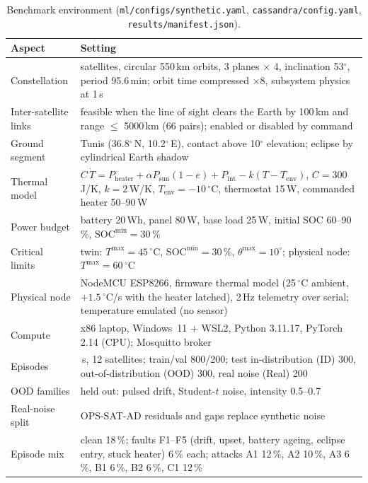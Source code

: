 \documentclass[10pt,a4paper]{article}
\newcommand{\file}[1]{\texttt{#1}}
\newcommand{\degC}{$^{\circ}$C}
\begin{document}
\begin{table}[ht]
\centering
\caption{Benchmark environment (\file{ml/configs/synthetic.yaml}, \file{cassandra/config.yaml},
\file{results/manifest.json}).}
\label{tab:testbed}
\small
\begin{tabular}{@{}>{\raggedright\arraybackslash}p{}>{\raggedright\arraybackslash}p{}@{}}
\toprule
Aspect & Setting \\
\midrule
Constellation & 12 satellites, circular 550\,km orbits, 3 planes $\times$ 4, inclination 53$^{\circ}$, period 95.6\,min; orbit time compressed $\times$8, subsystem physics at 1\,s \\
Inter-satellite links & feasible when the line of sight clears the Earth by 100\,km and range $\le$ 5000\,km (66 pairs); enabled or disabled by command \\
Ground segment & Tunis (36.8$^{\circ}$\,N, 10.2$^{\circ}$\,E), contact above 10$^{\circ}$ elevation; eclipse by cylindrical Earth shadow \\
Thermal model & $C\,\dot T=P_{\mathrm{heater}}+\alpha P_{\mathrm{sun}}(1-e)+P_{\mathrm{int}}-k(T-T_{\mathrm{env}})$, $C=300$\,J/K, $k=2$\,W/K, $T_{\mathrm{env}}=-10$\,\degC, thermostat 15\,W, commanded heater 50--90\,W \\
Power budget & battery 20\,Wh, panel 80\,W, base load 25\,W, initial SOC 60--90\,\%, $\mathrm{SOC}^{\min}=30$\,\% \\
Critical limits & twin: $T^{\max}=45$\,\degC, $\mathrm{SOC}^{\min}=30$\,\%, $\theta^{\max}=10^{\circ}$; physical node: $T^{\max}=60$\,\degC \\
Physical node & NodeMCU ESP8266, firmware thermal model (25\,\degC{} ambient, $+1.5$\,\degC/s with the heater latched), 2\,Hz telemetry over serial; temperature emulated (no sensor) \\
Compute & x86 laptop, Windows~11 + WSL2, Python 3.11.17, PyTorch 2.14 (CPU); Mosquitto broker \\
Episodes & 600\,s, 12 satellites; train/val 800/200; test in-distribution (ID) 300, out-of-distribution (OOD) 300, real noise (Real) 200 \\
OOD families & held out: pulsed drift, Student-$t$ noise, intensity 0.5--0.7 \\
Real-noise split & OPS-SAT-AD residuals and gaps replace synthetic noise~\cite{opssatad} \\
Episode mix & clean 18\,\%; faults F1--F5 (drift, upset, battery ageing, eclipse entry, stuck heater) 6\,\% each; attacks A1 12\,\%, A2 10\,\%, A3 6\,\%, B1 6\,\%, B2 6\,\%, C1 12\,\% \\
\bottomrule
\end{tabular}
\end{table}
\end{document}
